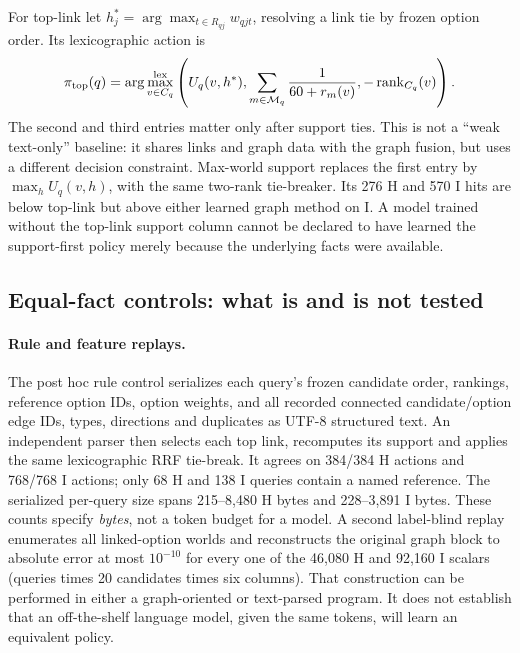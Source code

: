  For top-link let $h_j^*=\arg\max_{t\in R_{qj}}w_{qjt}$, resolving a link
 tie by frozen option order. Its lexicographic action is
 \begin{equation}
 \pi_{\rm top}(q)=\arg\max_{v\in C_q}^{\rm lex}
  \left(U_q(v,h^*),\sum_{m\in\mathcal M_q}\frac{1}{60+r_m(v)},
  -\operatorname{rank}_{C_q}(v)\right).
 \end{equation}
 The second and third entries matter only after support ties. This is
 not a ``weak text-only'' baseline: it shares links and graph data with
 the graph fusion, but uses a different decision constraint. Max-world
 support replaces the first entry by $\max_hU_q(v,h)$, with the same
 two-rank tie-breaker. Its 276 H and 570 I hits are below top-link but
 above either learned graph method on I. A model trained without the
 top-link support column cannot be declared to have learned the
 support-first policy merely because the underlying facts were available.

 \subsection{Equal-fact controls: what is and is not tested}\label{app:equalfacts}
 \paragraph{Rule and feature replays.}
 The post hoc rule control serializes each query's frozen candidate order,
 rankings, reference option IDs, option weights, and all recorded connected
 candidate/option edge IDs, types, directions and duplicates as UTF-8
 structured text. An independent parser then selects each top link,
 recomputes its support and applies the same lexicographic RRF tie-break.
 It agrees on 384/384 H actions and 768/768 I actions; only 68 H and 138 I
 queries contain a named reference. The serialized per-query size spans
 215--8,480 H bytes and 228--3,891 I bytes. These counts specify \emph{bytes},
 not a token budget for a model. A second label-blind replay enumerates
 all linked-option worlds and reconstructs the original graph block
 to absolute error at most $10^{-10}$ for every one of the 46,080 H and
 92,160 I scalars (queries times 20 candidates times six columns).
 That construction can be performed in either a graph-oriented or
 text-parsed program. It does not establish that an off-the-shelf
 language model, given the same tokens, will learn an equivalent policy.

